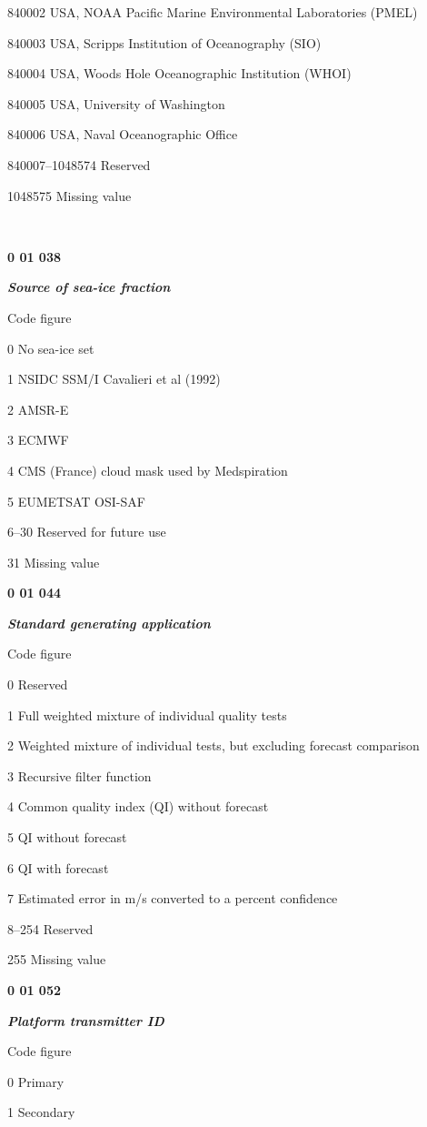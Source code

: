 840002 USA, NOAA Pacific Marine Environmental Laboratories (PMEL)

840003 USA, Scripps Institution of Oceanography (SIO)

840004 USA, Woods Hole Oceanographic Institution (WHOI)

840005 USA, University of Washington

840006 USA, Naval Oceanographic Office

840007--1048574 Reserved

1048575 Missing value

\textbf{\\
}

\textbf{0 01 038}

\emph{\textbf{Source of sea-ice fraction}}

Code figure

0 No sea-ice set

1 NSIDC SSM/I Cavalieri et al (1992)

2 AMSR-E

3 ECMWF

4 CMS (France) cloud mask used by Medspiration

5 EUMETSAT OSI-SAF

6--30 Reserved for future use

31 Missing value

\textbf{0 01 044}

\emph{\textbf{Standard generating application}}

Code figure

0 Reserved

1 Full weighted mixture of individual quality tests

2 Weighted mixture of individual tests, but excluding forecast comparison

3 Recursive filter function

4 Common quality index (QI) without forecast

5 QI without forecast

6 QI with forecast

7 Estimated error in m/s converted to a percent confidence

8--254 Reserved

255 Missing value

\textbf{0 01 052}

\emph{\textbf{Platform transmitter ID}}

Code figure

0 Primary

1 Secondary

